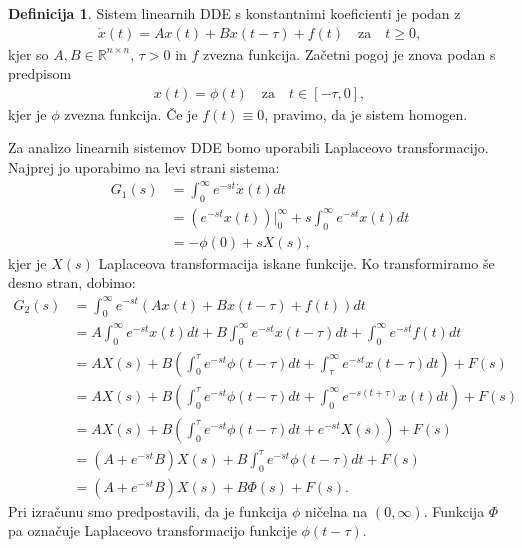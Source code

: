 \documentclass[12pt,a4paper]{amsart}
\theoremstyle{definition} %
\newtheorem{definicija}{Definicija}[section]
\theoremstyle{plain} %
\newcommand{\R}{\mathbb R}
\begin{document}
\begin{definicija}
    Sistem linearnih DDE s konstantnimi koeficienti je podan z 
    \begin{equation} \label{eq5}
        \begin{split}
            \dot{x}(t)=Ax(t)+Bx(t-\tau)+f(t)\quad \text{za}\quad t\geq0,
        \end{split}
    \end{equation} kjer so
    $A,B\in\R^{n\times n}$, $\tau>0$ in $f$ zvezna funkcija. Začetni pogoj je znova podan s predpisom
    \begin{equation} \label{eq6}
        \begin{split}
            x(t)=\phi(t)\quad \text{za}\quad t\in [-\tau,0],
        \end{split}
    \end{equation}
    kjer je $\phi$ zvezna funkcija. Če je $f(t)\equiv0$, pravimo,
    da je sistem homogen.
\end{definicija}
Za analizo linearnih sistemov DDE bomo uporabili Laplaceovo transformacijo. Najprej jo uporabimo na levi strani sistema:
\begin{equation*}
    \begin{split}
        G_1(s)&= \int_0^{\infty}e^{-st}\dot{x}(t)dt \\
            &= (e^{-st}x(t))\Bigr|_{0}^{\infty} + s\int_0^{\infty}e^{-st}x(t)dt \\
            &= -\phi(0) + sX(s),
    \end{split}      
\end{equation*}
kjer je $X(s)$ Laplaceova transformacija iskane funkcije.
Ko transformiramo še desno stran, dobimo:
\begin{equation*}
    \begin{split}
        G_2(s)&= \int_0^{\infty}e^{-st}\left(Ax(t)+Bx(t-\tau)+f(t)\right)dt \\
            &= A\int_0^{\infty}e^{-st}x(t)dt+B\int_0^{\infty}e^{-st}x(t-\tau)dt+\int_0^{\infty}e^{-st}f(t)dt \\
            &= AX(s) + B\left(\int_0^{\tau}e^{-st}\phi(t-\tau)dt+\int_{\tau}^{\infty}e^{-st}x(t-\tau)dt\right) + F(s) \\
            &= AX(s) + B\left(\int_0^{\tau}e^{-st}\phi(t-\tau)dt+\int_{0}^{\infty}e^{-s(t+\tau)}x(t)dt\right) + F(s) \\
            &= AX(s) + B\left(\int_0^{\tau}e^{-st}\phi(t-\tau)dt+e^{-st}X(s)\right)+F(s) \\
            &= (A+e^{-st}B)X(s) + B\int_0^{\tau}e^{-st}\phi(t-\tau)dt+F(s) \\
            &= (A+e^{-st}B)X(s) + B\Phi(s)+F(s).
    \end{split}      
\end{equation*}
Pri izračunu smo predpostavili, da je funkcija $\phi$ ničelna na $(0,\infty)$. Funkcija $\Phi$ pa 
označuje Laplaceovo transformacijo funkcije $\phi(t-\tau)$.
\end{document}
